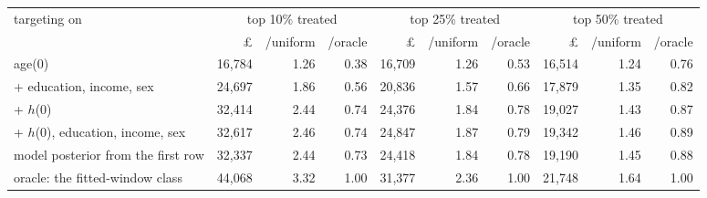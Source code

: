 \begin{tabular}{lrrrrrrrrr}
\toprule
targeting on & \multicolumn{3}{c}{top 10\% treated} & \multicolumn{3}{c}{top 25\% treated} & \multicolumn{3}{c}{top 50\% treated} \\
\cmidrule(lr){2-4} \cmidrule(lr){5-7} \cmidrule(lr){8-10}
 & \pounds & /uniform & /oracle & \pounds & /uniform & /oracle & \pounds & /uniform & /oracle \\
\midrule
age(0) & 16,784 & 1.26 & 0.38 & 16,709 & 1.26 & 0.53 & 16,514 & 1.24 & 0.76 \\
+ education, income, sex & 24,697 & 1.86 & 0.56 & 20,836 & 1.57 & 0.66 & 17,879 & 1.35 & 0.82 \\
+ $h$(0) & 32,414 & 2.44 & 0.74 & 24,376 & 1.84 & 0.78 & 19,027 & 1.43 & 0.87 \\
+ $h$(0), education, income, sex & 32,617 & 2.46 & 0.74 & 24,847 & 1.87 & 0.79 & 19,342 & 1.46 & 0.89 \\
model posterior from the first row & 32,337 & 2.44 & 0.73 & 24,418 & 1.84 & 0.78 & 19,190 & 1.45 & 0.88 \\
oracle: the fitted-window class & 44,068 & 3.32 & 1.00 & 31,377 & 2.36 & 1.00 & 21,748 & 1.64 & 1.00 \\
\bottomrule
\end{tabular}
